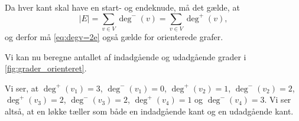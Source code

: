 Da hver kant skal have en start- og endeknude, må det gælde, at 
\begin{equation}
|E|= \sum_{v \in V} { } \deg^{-}(v) = \sum_{v \in V} { } \deg^{+}(v),
\end{equation}
og derfor må \autoref{eq:degv=2e} også gælde for orienterede grafer.

%
%
%
%
%
%
%
%
%
%


\begin{exmp} \label{ex:grader_orienteret}
Vi kan nu beregne antallet af indadgående og udadgående grader i \autoref{fig:grader_orienteret}.

Vi ser, at $\deg^{+}(v_{1})=3$, $\deg^{-}(v_{1})=0$, $\deg^{+}(v_{2})=1$, $\deg^{-}(v_{2})=2$, $\deg^{+}(v_{3})=2$, $\deg^{-}(v_{3})=2$, $\deg^{+}(v_{4})=1$ og $\deg^{-}(v_{4})=3$. Vi ser altså, at en løkke tæller som både en indadgående kant og en udadgående kant.
\end{exmp}

